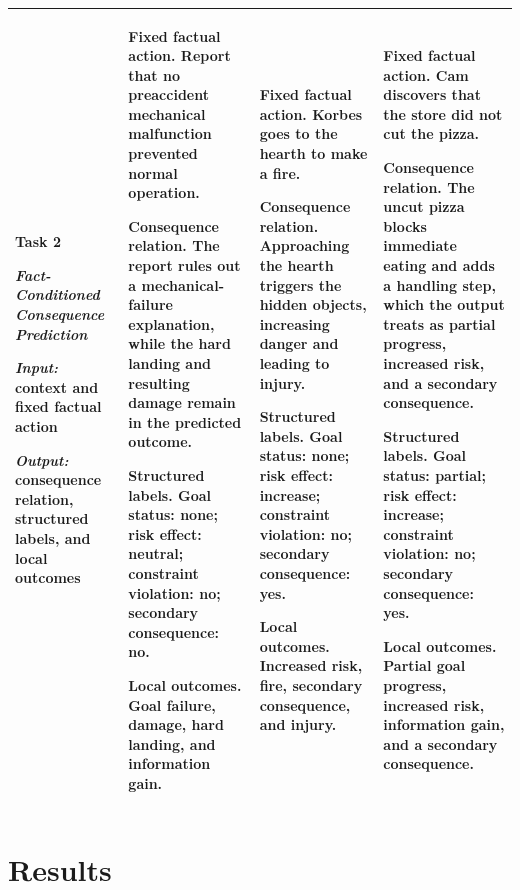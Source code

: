 \documentclass[pdflatex,sn-mathphys-num]{sn-jnl}%
\theoremstyle{thmstyleone}%
\theoremstyle{thmstyletwo}%
\theoremstyle{thmstylethree}%
\begin{document}
\begin{table}
\begin{tabular}{p{}p{}p{}p{}}
\\
\midrule
\raggedright\textbf{Task 2}\par
\textit{Fact-Conditioned Consequence Prediction}\par
\textit{Input:} context and fixed factual action\par
\textit{Output:} consequence relation, structured labels, and local outcomes
&
\textbf{Fixed factual action.} Report that no preaccident mechanical malfunction prevented normal operation.\par
\textbf{Consequence relation.} The report rules out a mechanical-failure explanation, while the hard landing and resulting damage remain in the predicted outcome.\par
\textbf{Structured labels.} Goal status: none; risk effect: neutral; constraint violation: no; secondary consequence: no.\par
\textbf{Local outcomes.} Goal failure, damage, hard landing, and information gain.
&
\textbf{Fixed factual action.} Korbes goes to the hearth to make a fire.\par
\textbf{Consequence relation.} Approaching the hearth triggers the hidden objects, increasing danger and leading to injury.\par
\textbf{Structured labels.} Goal status: none; risk effect: increase; constraint violation: no; secondary consequence: yes.\par
\textbf{Local outcomes.} Increased risk, fire, secondary consequence, and injury.
&
\textbf{Fixed factual action.} Cam discovers that the store did not cut the pizza.\par
\textbf{Consequence relation.} The uncut pizza blocks immediate eating and adds a handling step, which the output treats as partial progress, increased risk, and a secondary consequence.\par
\textbf{Structured labels.} Goal status: partial; risk effect: increase; constraint violation: no; secondary consequence: yes.\par
\textbf{Local outcomes.} Partial goal progress, increased risk, information gain, and a secondary consequence.
\\
\bottomrule
\end{tabular}
\end{table}

\section{Results}
\label{sec:mttravel-results}
\end{document}
